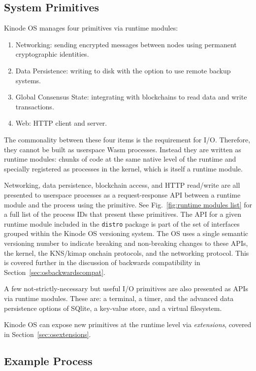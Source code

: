 \documentclass[runningheads]{llncs}
\begin{document}
\subsection{System Primitives}
\label{sec:osprimitives}

Kinode OS manages four primitives via runtime modules:

\begin{enumerate}
    \item Networking: sending encrypted messages between nodes using permanent cryptographic identities.
    \item Data Persistence: writing to disk with the option to use remote backup systems.
    \item Global Consensus State: integrating with blockchains to read data and write transactions.
    \item Web: HTTP client and server.
\end{enumerate}

The commonality between these four items is the requirement for I/O.
Therefore, they cannot be built as userspace Wasm processes.
Instead they are written as runtime modules: chunks of code at the same native level of the runtime and specially registered as processes in the kernel, which is itself a runtime module.

Networking, data persistence, blockchain access, and HTTP read/write are all presented to userspace processes as a request-response API between a runtime module and the process using the primitive.
See Fig.~\ref{fig:runtime modules list} for a full list of the process IDs that present these primitives.
The API for a given runtime module included in the \verb|distro| package is part of the set of interfaces grouped within the Kinode OS versioning system.
The OS uses a single semantic versioning number to indicate breaking and non-breaking changes to these APIs, the kernel, the KNS/kimap onchain protocols, and the networking protocol.
This is covered further in the discussion of backwards compatibility in Section~\ref{sec:osbackwardscompat}.

A few not-strictly-necessary but useful I/O primitives are also presented as APIs via runtime modules.
These are: a terminal, a timer, and the advanced data persistence options of SQlite, a key-value store, and a virtual filesystem.

Kinode OS can expose new primitives at the runtime level via \textit{extensions}, covered in Section~\ref{sec:osextensions}.

\subsection{Example Process}
\label{sec:osexampleprocess}
\end{document}
